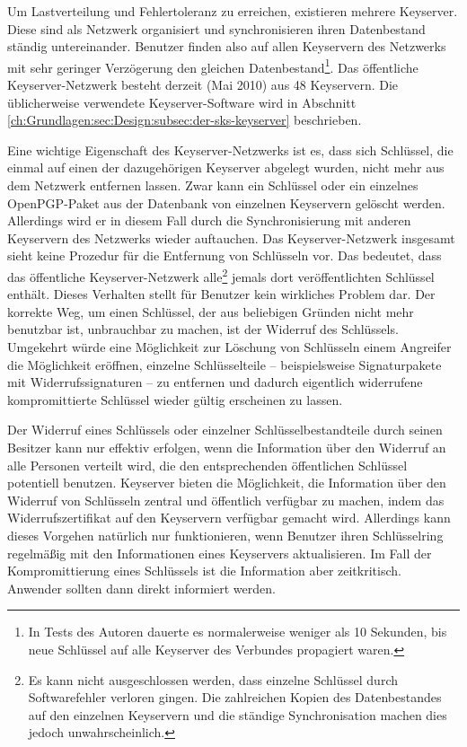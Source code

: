Um Lastverteilung und Fehlertoleranz zu erreichen, existieren mehrere
Keyserver. Diese sind als Netzwerk organisiert und synchronisieren
ihren Datenbestand ständig untereinander. Benutzer finden also auf
allen Keyservern des Netzwerks mit sehr geringer Verzögerung den
gleichen Datenbestand\footnote{In Tests des Autoren dauerte es
  normalerweise weniger als 10 Sekunden, bis neue Schlüssel auf alle
  Keyserver des Verbundes propagiert waren.}. Das öffentliche
Keyserver-Netzwerk besteht derzeit (Mai 2010) aus 48
Keyservern\cite{SKS}. Die üblicherweise
verwendete Keyserver-Software wird in Abschnitt
\ref{ch:Grundlagen:sec:Design:subsec:der-sks-keyserver} beschrieben.

Eine wichtige Eigenschaft des Keyserver-Netzwerks ist es, dass sich
Schlüssel, die einmal auf einen der dazugehörigen Keyserver
abgelegt wurden, nicht mehr aus dem Netzwerk entfernen lassen. Zwar
kann ein Schlüssel oder ein einzelnes OpenPGP-Paket aus der
Datenbank von einzelnen Keyservern gelöscht werden. Allerdings wird
er in diesem Fall durch die Synchronisierung mit anderen Keyservern
des Netzwerks wieder auftauchen. Das Keyserver-Netzwerk insgesamt
sieht keine Prozedur für die Entfernung von Schlüsseln vor. Das
bedeutet, dass das öffentliche Keyserver-Netzwerk alle\footnote{Es
  kann nicht ausgeschlossen werden, dass einzelne Schlüssel durch
  Softwarefehler verloren gingen. Die zahlreichen Kopien des
  Datenbestandes auf den einzelnen Keyservern und die ständige
  Synchronisation machen dies jedoch unwahrscheinlich.} jemals dort
veröffentlichten Schlüssel enthält. Dieses Verhalten stellt
für Benutzer kein wirkliches Problem dar. Der korrekte Weg, um einen
Schlüssel, der aus beliebigen Gründen nicht mehr benutzbar ist,
unbrauchbar zu machen, ist der Widerruf des Schlüssels. Umgekehrt
würde eine Möglichkeit zur Löschung von Schlüsseln einem
Angreifer die Möglichkeit eröffnen, einzelne Schlüsselteile --
beispielsweise Signaturpakete mit Widerrufssignaturen -- zu entfernen
und dadurch eigentlich widerrufene kompromittierte Schlüssel wieder
gültig erscheinen zu lassen.

Der Widerruf eines Schlüssels oder einzelner Schlüsselbestandteile
durch seinen Besitzer kann nur effektiv erfolgen, wenn die Information
über den Widerruf an alle Personen verteilt wird, die den
entsprechenden öffentlichen Schlüssel potentiell
benutzen. Keyserver bieten die Möglichkeit, die Information über
den Widerruf von Schlüsseln zentral und öffentlich verfügbar zu
machen, indem das Widerrufszertifikat auf den Keyservern verfügbar
gemacht wird. Allerdings kann dieses Vorgehen natürlich nur
funktionieren, wenn Benutzer ihren Schlüsselring regelmäßig mit
den Informationen eines Keyservers aktualisieren. Im Fall der
Kompromittierung eines Schlüssels ist die Information aber
zeitkritisch. Anwender sollten dann direkt informiert werden.

